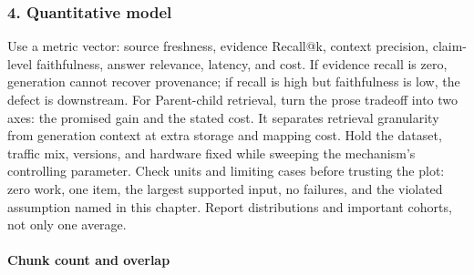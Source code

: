 \subsubsection*{4. Quantitative model}
Use a metric vector: source freshness, evidence Recall@k, context precision, claim-level faithfulness, answer relevance, latency, and cost. If evidence recall is zero, generation cannot recover provenance; if recall is high but faithfulness is low, the defect is downstream.
For Parent-child retrieval, turn the prose tradeoff into two axes: the promised gain and the stated cost. It separates retrieval granularity from generation context at extra storage and mapping cost. Hold the dataset, traffic mix, versions, and hardware fixed while sweeping the mechanism's controlling parameter.
Check units and limiting cases before trusting the plot: zero work, one item, the largest supported input, no failures, and the violated assumption named in this chapter. Report distributions and important cohorts, not only one average.
\paragraph{Chunk count and overlap}
